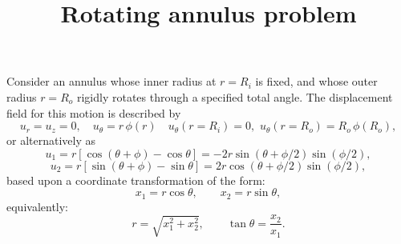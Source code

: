 \documentclass[12pt]{article}
\title{Rotating annulus problem}
\author{}
\date{}
\begin{document}
\maketitle

Consider an annulus whose inner radius at $r = R_i$ is fixed, and whose outer radius $r = R_o$ rigidly rotates through a specified total angle. The displacement field for this motion is described by
\begin{equation}
	u_r = u_z = 0, \quad u_\theta = r \, \phi(r) \quad u_\theta (r = R_i) = 0, \, \, u_\theta (r = R_o) = R_o \, \phi (R_o),
\end{equation}
or alternatively as
\begin{equation}
	u_1 = r \left[ \cos \left(\theta + \phi \right) - \cos \theta \right] = -2 r \sin (\theta + \phi / 2) \sin (\phi / 2),
\end{equation}
\begin{equation}
	u_2 = r \left[ \sin \left(\theta + \phi \right) - \sin \theta \right] = 2 r \cos (\theta + \phi / 2) \sin (\phi / 2),
\end{equation}
based upon a coordinate transformation of the form:
\begin{equation}
	x_1 = r \cos \theta, \qquad x_2 = r \sin \theta,
\end{equation}
equivalently:
\begin{equation}
	r = \sqrt{x_1^2 + x_2^2}, \qquad \tan \theta = \frac{x_2}{x_1}.
	\label{inverse}
\end{equation}
\end{document}
